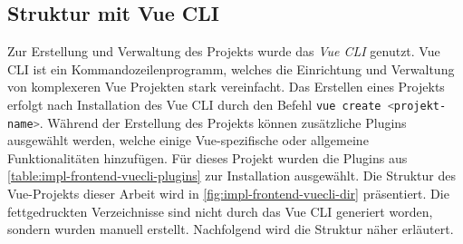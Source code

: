 \subsection{Struktur mit Vue CLI} \label{ssec:impl-frontend-structure}

Zur Erstellung und Verwaltung des Projekts wurde das \textit{Vue CLI} genutzt.
Vue CLI ist ein Kommandozeilenprogramm, welches die Einrichtung und Verwaltung
von komplexeren Vue Projekten stark vereinfacht. Das Erstellen eines Projekts
erfolgt nach Installation des Vue CLI durch den Befehl \lstinline[style=code,
    language=bash, style=inline]{vue create <projekt-name>}. Während der Erstellung
des Projekts können zusätzliche Plugins ausgewählt werden, welche einige
Vue-spezifische oder allgemeine Funktionalitäten hinzufügen. Für dieses Projekt
wurden die Plugins aus \autoref{table:impl-frontend-vuecli-plugins} zur
Installation ausgewählt. Die Struktur des Vue-Projekts dieser Arbeit wird in
\autoref{fig:impl-frontend-vuecli-dir} präsentiert. Die fettgedruckten
Verzeichnisse sind nicht durch das Vue CLI generiert worden, sondern wurden
manuell erstellt. Nachfolgend wird die Struktur näher erläutert.

